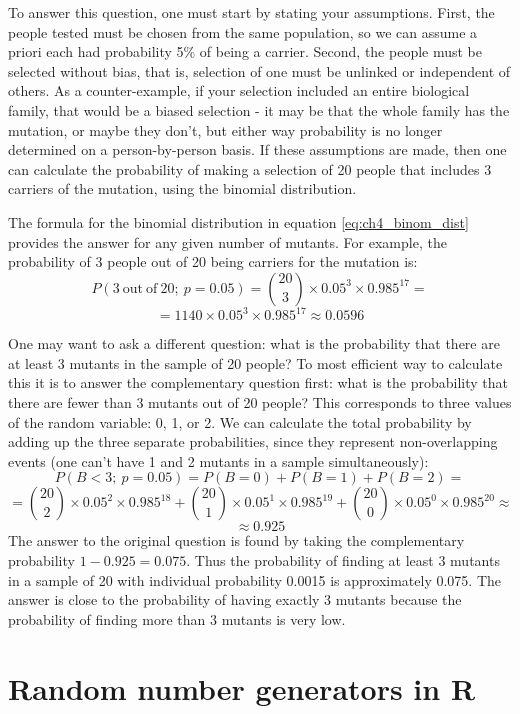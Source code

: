 \documentclass[
]{book}
\theoremstyle{definition}
\theoremstyle{definition}
\theoremstyle{definition}
\theoremstyle{remark}
\begin{document}
To answer this question, one must start by stating your assumptions. First, the people tested must be chosen from the same population, so we can assume a priori each had probability 5\% of being a carrier. Second, the people must be selected without bias, that is, selection of one must be unlinked or independent of others. As a counter-example, if your selection included an entire biological family, that would be a biased selection - it may be that the whole family has the mutation, or maybe they don't, but either way probability is no longer determined on a person-by-person basis. If these assumptions are made, then one can calculate the probability of making a selection of 20 people that includes 3 carriers of the mutation, using the binomial distribution.

The formula for the binomial distribution in equation \ref{eq:ch4_binom_dist} provides the answer for any given number of mutants. For example, the probability of 3 people out of 20 being carriers for the mutation is:
\[P(\mathrm{3 \ out \ of  \ 20}; \ p=0.05) = \binom{20}{3} \times 0.05^3  \times 0.985^{17} =  \]
\[ = 1140 \times 0.05^3 \times 0.985^{17} \approx 0.0596\]

One may want to ask a different question: what is the probability that there are at least 3 mutants in the sample of 20 people? To most efficient way to calculate this it is to answer the complementary question first: what is the probability that there are fewer than 3 mutants out of 20 people? This corresponds to three values of the random variable: 0, 1, or 2. We can calculate the total probability by adding up the three separate probabilities, since they represent non-overlapping events (one can't have 1 and 2 mutants in a sample simultaneously):
\[ P(B < 3; \  p=0.05) = P(B=0) + P(B=1) + P(B=2) = \]
\[ = \binom{20}{2} \times 0.05^2  \times 0.985^{18} +\binom{20}{1} \times 0.05^1  \times 0.985^{19} +\binom{20}{0} \times 0.05^0  \times 0.985^{20} \approx \]
\[ \approx 0.925 \]
The answer to the original question is found by taking the complementary probability \(1-0.925=0.075\). Thus the probability of finding at least 3 mutants in a sample of 20 with individual probability 0.0015 is approximately 0.075. The answer is close to the probability of having exactly 3 mutants because the probability of finding more than 3 mutants is very low.

\hypertarget{random-number-generators-in-r}{%
\section{Random number generators in R}\label{random-number-generators-in-r}}
\end{document}
